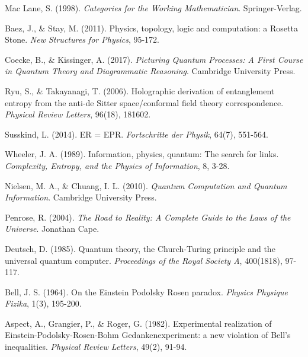 \documentclass[12pt,a4paper]{article}
\begin{document}
\begin{thebibliography}{99}
Mac Lane, S. (1998). \textit{Categories for the Working Mathematician}. Springer-Verlag.

Baez, J., \& Stay, M. (2011). Physics, topology, logic and computation: a Rosetta Stone. \textit{New Structures for Physics}, 95-172.

Coecke, B., \& Kissinger, A. (2017). \textit{Picturing Quantum Processes: A First Course in Quantum Theory and Diagrammatic Reasoning}. Cambridge University Press.

Ryu, S., \& Takayanagi, T. (2006). Holographic derivation of entanglement entropy from the anti-de Sitter space/conformal field theory correspondence. \textit{Physical Review Letters}, 96(18), 181602.

Susskind, L. (2014). ER = EPR. \textit{Fortschritte der Physik}, 64(7), 551-564.

Wheeler, J. A. (1989). Information, physics, quantum: The search for links. \textit{Complexity, Entropy, and the Physics of Information}, 8, 3-28.

Nielsen, M. A., \& Chuang, I. L. (2010). \textit{Quantum Computation and Quantum Information}. Cambridge University Press.

Penrose, R. (2004). \textit{The Road to Reality: A Complete Guide to the Laws of the Universe}. Jonathan Cape.

Deutsch, D. (1985). Quantum theory, the Church-Turing principle and the universal quantum computer. \textit{Proceedings of the Royal Society A}, 400(1818), 97-117.

Bell, J. S. (1964). On the Einstein Podolsky Rosen paradox. \textit{Physics Physique Fizika}, 1(3), 195-200.

Aspect, A., Grangier, P., \& Roger, G. (1982). Experimental realization of Einstein-Podolsky-Rosen-Bohm Gedankenexperiment: a new violation of Bell's inequalities. \textit{Physical Review Letters}, 49(2), 91-94.

\end{thebibliography}
\end{document}
